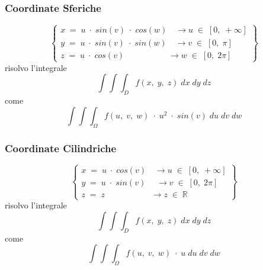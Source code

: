\documentclass[a4paper, 10pt]{article}
\begin{document}
  				\subsubsection{Coordinate Sferiche}
  					 \[
	  					 \left\{ 
		  					 \begin{array}{l} 
			  					 x\; =\; u\; \cdot\; sin(v)\; \cdot\; cos(w)\quad \rightarrow u\; \in\; [0,\; +\infty] \\
			  					 y\; =\; u\; \cdot\; sin(v)\; \cdot\; sin(w)\quad \rightarrow v\; \in\; [0,\; \pi] \\ 
			  					 z\; =\; u\; \cdot\; cos(v)\quad\quad\quad\quad\quad\; \rightarrow w\; \in\; [0,\; 2\pi]
		  					 \end{array} 
	  					 \right\}
  					 \]			 
  					 risolvo l'integrale
	  					 \[
	  					 	\int{\int{\int_{D}^{}{f(x,\; y,\; z)\; dx\; dy\; dz}}}
	  					 \]come
	  					 \[
	  					 	\int{\int{\int_{\Omega}^{}{f(u,\; v,\; w)\; \cdot\; u^2\; \cdot\; sin(v)\; du\; dv\; dw}}}	
	  					 \]
  					 
  				\subsubsection{Coordinate Cilindriche}  		
  					\[
	  					\left\{ 
		  					\begin{array}{l} 
			  					x\; =\; u\; \cdot\; cos(v)\quad \rightarrow u\; \in\; [0,\; +\infty] \\
			  					y\; =\; u\; \cdot\; sin(v)\;\quad \rightarrow v\; \in\; [0,\; 2\pi] \\ 
			  					z\; =\; z\;\quad\quad\quad\quad\quad\; \rightarrow z\; \in\; \mathbb{R}
		  					\end{array} 
	  					\right\}
  					\]
  					risolvo l'integrale
	  					\[
	  						\int{\int{\int_{D}^{}{f(x,\; y,\; z)\; dx\; dy\; dz}}}
	  					\]come
	  					\[
	  						\int{\int{\int_{\Omega}^{}{f(u,\; v,\; w)\; \cdot\; u\; du\; dv\; dw}}}	
	  					\] 					
 					
\end{document}
